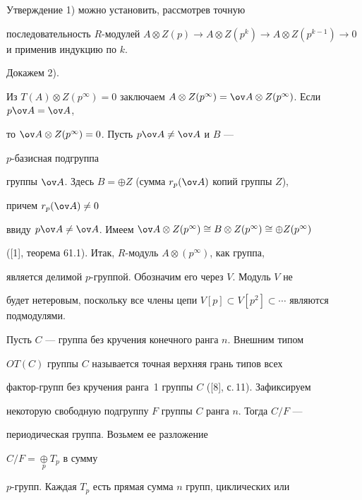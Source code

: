  


\begin{pf} 


Утверждение 1) можно установить, рассмотрев точную 


последовательность $R$-модулей $A\otimes Z(p)\to A\otimes Z(p^k)\to 


A\otimes Z(p^{k-1})\to0$ и применив индукцию по $k$. 


 


Докажем 2).


Из $T(A)\otimes Z(p^\infty)=0$ заключаем $A\otimes Z(p^\infty)=\ov 


A\otimes Z(p^\infty)$. Если $p\ov A=\ov A$, 


то $\ov A\otimes Z(p^\infty)=0$. Пусть $p\ov A\ne\ov A$ и $B$ --- 


$p$-базисная подгруппа 


группы $\ov A$. Здесь $B=\oplus Z$ (сумма $r_p(\ov A)$ копий группы $Z$), 


причем $r_p(\ov A)\ne0$ 


ввиду $p\ov A\ne\ov A$. Имеем $\ov A\otimes Z(p^\infty)\cong B\otimes 


Z(p^\infty)\cong \oplus Z(p^\infty)$ 


([1], теорема 61.1). Итак, $R$-модуль $A\otimes(p^\infty)$, как группа, 


является делимой $p$-группой. Обозначим его через $V$. Модуль $V$ не 


будет нетеровым, поскольку все члены цепи $V[p]\subset 


V[p^2]\subset\dotsb$ являются подмодулями. 


\end{pf}


 


Пусть $C$ --- группа без кручения конечного ранга $n$. Внешним типом 


$OT(C)$ группы $C$ называется точная верхняя грань типов всех 


фактор-групп без кручения ранга~1 группы $C$ ([8], с.\,11). Зафиксируем 


некоторую свободную подгруппу $F$ группы $C$ ранга $n$. Тогда $C/F$ --- 


периодическая группа. Возьмем ее разложение 


$C/F=\mathop{\oplus}\limits_{p}T_p$ в сумму 


$p$-групп. Каждая $T_p$ есть прямая сумма $n$ групп, циклических или 


